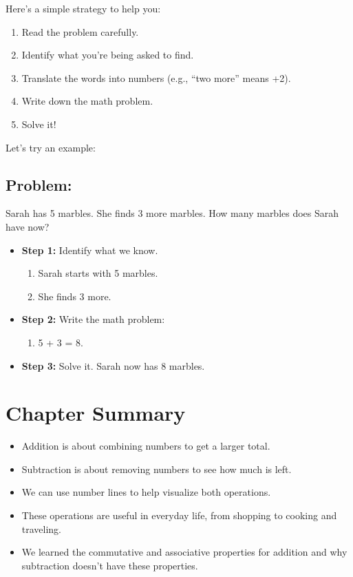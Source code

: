 Here’s a simple strategy to help you:
\begin{enumerate}
    \item Read the problem carefully.
    \item Identify what you’re being asked to find.
    \item Translate the words into numbers (e.g., “two more” means +2).
    \item Write down the math problem.
    \item Solve it!
\end{enumerate}

Let’s try an example:
\subsection{\textbf{Problem:}}
 Sarah has 5 marbles. She finds 3 more marbles. How many marbles does Sarah have now?
\begin{itemize}
  
    \item \textbf{Step 1:} Identify what we know.
    \begin{enumerate}[label=\alph*)]
        \item Sarah starts with 5 marbles.
        \item She finds 3 more.
    \end{enumerate}
    \item \textbf{Step 2:} Write the math problem:
    \begin{enumerate}[label=\alph*)]
        \item 5 + 3 = 8.
    \end{enumerate}
    \item \textbf{Step 3:} Solve it. Sarah now has 8 marbles.
\end{itemize}

\section{Chapter Summary}
\begin{itemize}
    \item Addition is about combining numbers to get a larger total.
    \item Subtraction is about removing numbers to see how much is left.
    \item We can use number lines to help visualize both operations.
    \item These operations are useful in everyday life, from shopping to cooking and traveling.
    \item We learned the commutative and associative properties for addition and why subtraction doesn’t have these properties.
\end{itemize}
